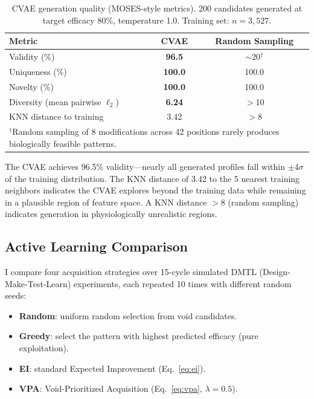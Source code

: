 \documentclass{article}
\begin{document}
\begin{table}[t]
\caption{CVAE generation quality (MOSES-style metrics). 200 candidates generated at target efficacy 80\%, temperature 1.0. Training set: $n=3{,}527$.}
\label{tab:generation}
\centering
\small
\begin{tabular}{@{}lcc@{}}
\toprule
\textbf{Metric} & \textbf{CVAE} & \textbf{Random Sampling} \\
\midrule
Validity (\%) & \textbf{96.5} & $\sim$20$^\dagger$ \\
Uniqueness (\%) & \textbf{100.0} & 100.0 \\
Novelty (\%) & \textbf{100.0} & 100.0 \\
Diversity (mean pairwise $\ell_2$) & \textbf{6.24} & $>$10 \\
KNN distance to training & 3.42 & $>$8 \\
\bottomrule
\multicolumn{3}{l}{\scriptsize $^\dagger$Random sampling of 8 modifications across 42 positions rarely produces biologically feasible patterns.}
\end{tabular}
\end{table}

The CVAE achieves 96.5\% validity---nearly all generated profiles fall within $\pm 4\sigma$ of the training distribution. The KNN distance of 3.42 to the 5 nearest training neighbors indicates the CVAE explores beyond the training data while remaining in a plausible region of feature space. A KNN distance $>8$ (random sampling) indicates generation in physiologically unrealistic regions.

\subsection{Active Learning Comparison}

I compare four acquisition strategies over 15-cycle simulated DMTL (Design-Make-Test-Learn) experiments, each repeated 10 times with different random seeds:

\begin{itemize}
  \item \textbf{Random}: uniform random selection from void candidates.
  \item \textbf{Greedy}: select the pattern with highest predicted efficacy (pure exploitation).
  \item \textbf{EI}: standard Expected Improvement (Eq.~\ref{eq:ei}).
  \item \textbf{VPA}: Void-Prioritized Acquisition (Eq.~\ref{eq:vpa}, $\lambda=0.5$).
\end{itemize}
\end{document}
